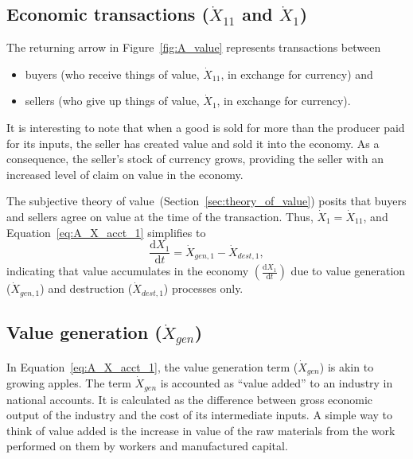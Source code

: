 \subsection[Economic transactions]{Economic transactions ($\dot{X}_{11}$ and $\dot{X}_{1}$)}

The returning arrow in Figure~\ref{fig:A_value} 
represents transactions between 
\begin{itemize}
	\item{buyers (who receive things of value, $\dot{X}_{11}$,
	in exchange for currency) and}
	\item{sellers (who give up things of value, $\dot{X}_{1}$,
	in exchange for currency).}
\end{itemize}

It is interesting to note that when a good is sold for more
than the producer paid for its inputs, 
the seller has created value and sold it into the economy. 
As a consequence, the seller's stock of currency grows,
providing the seller with an increased level of claim 
on value in the economy.

The subjective theory of value~(Section~\ref{sec:theory_of_value})
posits that buyers and sellers agree on value at the 
time of the transaction.
Thus, $\dot{X}_{1} = \dot{X}_{11}$, and Equation~\ref{eq:A_X_acct_1}
simplifies to
%
\begin{equation} \label{eq:A_X_acct_2}	
	\frac{\mathrm{d}X_{1}}{\mathrm{d}t}	
	= \dot{X}_{gen,1}
	- \dot{X}_{dest,1},
\end{equation}
%
indicating that value accumulates in the economy
$\left( \frac{\mathrm{d}X_{1}}{\mathrm{d}t} \right)$
due to value generation ($\dot{X}_{gen,1}$) 
and destruction ($\dot{X}_{dest,1}$) processes only.


\subsection[Value generation]{Value generation ($\dot{X}_{gen}$)}
\label{sec:value_generation}

\noindent In Equation~\ref{eq:A_X_acct_1}, 
the value generation term ($\dot{X}_{gen}$) is akin to growing apples.
The term $\dot{X}_{gen}$ is accounted as ``value added'' to an industry in national accounts.
It is calculated as the difference between gross economic output of the industry
and the cost of its intermediate inputs.\cite{BEAVA}  
A simple way to think of value added is
the increase in value of the raw materials from the work performed 
on them by workers and manufactured capital.


